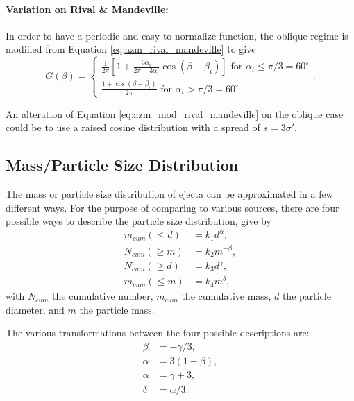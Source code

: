 \documentclass{article}
\begin{document}
\paragraph{Variation on Rival \& Mandeville:} In order to have a periodic and easy-to-normalize function, the oblique regime is modified from Equation \eqref{eq:azm_rival_mandeville} to give
\begin{equation}\label{eq:azm_mod_rival_mandeville}
G(\beta) =
\begin{cases}
\frac{1}{2\pi}\left[1+\frac{3\alpha_i}{2\pi - 3\alpha_i}\cos(\beta-\beta_i)\right] \text{  for $\alpha_i\le \pi/3 = 60^\circ$}\\
\frac{1 + \cos(\beta-\beta_i)}{2\pi}
\text{  for $\alpha_i > \pi/3 = 60^\circ$}
\end{cases}.
\end{equation}

An alteration of Equation \eqref{eq:azm_mod_rival_mandeville} on the oblique case could be to use a raised cosine distribution with a spread of $ s = 3\sigma'$.




\subsection{Mass/Particle Size Distribution}\label{ssec:Mass/Particle Size Distribution}

The mass or particle size distribution of ejecta can be approximated in a few different ways. For the purpose of comparing to various sources, there are four possible ways to describe the particle size distribution, give by \citep{koschny2001impacts_mass}
\begin{align}
m_{cum}(\le d) &= k_1 d^\alpha,\label{eq:KG01 m_cum d}\\
N_{cum}(\ge m) &= k_2 m^{-\beta},\label{eq:KG01 N_cum m}\\
N_{cum}(\ge d) &= k_3 d^\gamma,\label{eq:KG01 N_cum d}\\
m_{cum}(\le m) &= k_4 m^\delta,\label{eq:KG01 m_cum m}
\end{align}
with $N_{cum}$ the cumulative number, $m_{cum}$ the cumulative mass, $d$ the particle diameter, and $m$ the particle mass.

The various transformations between the four possible descriptions are:
\begin{align}
\beta &= -\gamma/3,\\
\alpha &= 3(1-\beta),\\
\alpha &= \gamma + 3,\\
\delta &= \alpha/3.
\end{align}
\end{document}
